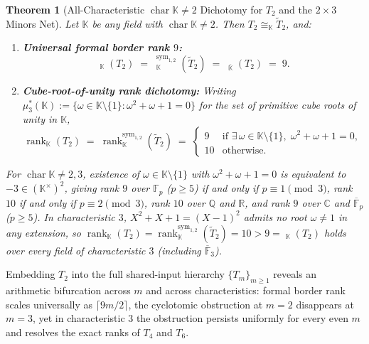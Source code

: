 \documentclass[11pt,reqno]{amsart}
\newtheorem{theorem}{Theorem}[section]
\theoremstyle{definition}
\theoremstyle{remark}
\numberwithin{equation}{section}
\newcommand{\FF}{\mathbb{F}}
\newcommand{\KK}{\mathbb{K}}
\newcommand{\QQ}{\mathbb{Q}}
\newcommand{\RR}{\mathbb{R}}
\newcommand{\CC}{\mathbb{C}}
\DeclareMathOperator{\rk}{rank}
\DeclareMathOperator{\brk}{\underline{rank}}
\DeclareMathOperator{\chr}{char}
\begin{document}
\begin{theorem}[All-Characteristic $\chr\KK \neq 2$ Dichotomy for $T_2$ and the $2 \times 3$ Minors Net]\label{thm:main-dichotomy}
Let $\KK$ be any field with $\chr\KK \neq 2$. Then $T_2 \cong_{\KK} \widetilde{T}_2$, and:
\begin{enumerate}[label=\textup{(\arabic*)},leftmargin=2em]
  \item \textbf{Universal formal border rank $9$:}
  \begin{equation}\label{eq:T2-border-rank}
    \brk_{\KK}(T_2) \;=\; \brk_{\KK}^{\mathrm{sym}_{1,2}}(\widetilde{T}_2) \;=\; \brk_{\overline{\KK}}(T_2) \;=\; 9.
  \end{equation}
  \item \textbf{Cube-root-of-unity rank dichotomy:} Writing $\mu_3^*(\KK) := \{\omega \in \KK\setminus\{1\} : \omega^2 + \omega + 1 = 0\}$ for the set of primitive cube roots of unity in $\KK$,
  \begin{equation}\label{eq:T2-rank-dichotomy}
    \rk_{\KK}(T_2) \;=\; \rk_{\KK}^{\mathrm{sym}_{1,2}}(\widetilde{T}_2) \;=\;
    \begin{cases}
      9 & \text{if } \exists\,\omega \in \KK\setminus\{1\},\; \omega^2+\omega+1=0, \\[3pt]
      10 & \text{otherwise.}
    \end{cases}
  \end{equation}
\end{enumerate}
For $\chr\KK \neq 2, 3$, existence of $\omega \in \KK\setminus\{1\}$ with $\omega^2 + \omega + 1 = 0$ is equivalent to $-3 \in (\KK^\times)^2$, giving rank $9$ over $\FF_p$ ($p \ge 5$) if and only if $p \equiv 1 \pmod 3$, rank $10$ if and only if $p \equiv 2 \pmod 3$, rank $10$ over $\QQ$ and $\RR$, and rank $9$ over $\CC$ and $\overline{\FF}_p$ ($p \ge 5$). In characteristic $3$, $X^2 + X + 1 = (X - 1)^2$ admits no root $\omega \neq 1$ in any extension, so $\rk_{\KK}(T_2) = \rk_{\KK}^{\mathrm{sym}_{1,2}}(\widetilde{T}_2) = 10 > 9 = \brk_{\KK}(T_2)$ holds over every field of characteristic $3$ (including $\overline{\FF}_3$).
\end{theorem}

Embedding $T_2$ into the full shared-input hierarchy $\{T_m\}_{m \ge 1}$ reveals an arithmetic bifurcation across $m$ and across characteristics: formal border rank scales universally as $\lceil 9m/2 \rceil$, the cyclotomic obstruction at $m = 2$ disappears at $m = 3$, yet in characteristic $3$ the obstruction persists uniformly for every even $m$ and resolves the exact ranks of $T_4$ and $T_6$.
\end{document}
